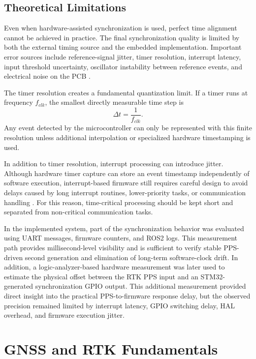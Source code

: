\subsection{Theoretical Limitations}

Even when hardware-assisted synchronization is used, perfect time alignment cannot be achieved in practice. The final synchronization quality is limited by both the external timing source and the embedded implementation. Important error sources include reference-signal jitter, timer resolution, interrupt latency, input threshold uncertainty, oscillator instability between reference events, and electrical noise on the PCB \cite{kopetz2011realtime,allan1966statistics,levine2012atomic}.

The timer resolution creates a fundamental quantization limit. If a timer runs at frequency $f_{clk}$, the smallest directly measurable time step is
\begin{equation}
\Delta t = \frac{1}{f_{clk}} .
\end{equation}
Any event detected by the microcontroller can only be represented with this finite resolution unless additional interpolation or specialized hardware timestamping is used.

In addition to timer resolution, interrupt processing can introduce jitter. Although hardware timer capture can store an event timestamp independently of software execution, interrupt-based firmware still requires careful design to avoid delays caused by long interrupt routines, lower-priority tasks, or communication handling \cite{kopetz2011realtime}. For this reason, time-critical processing should be kept short and separated from non-critical communication tasks.

In the implemented system, part of the synchronization behavior was evaluated using UART messages, firmware counters, and ROS2 logs. This measurement path provides millisecond-level visibility and is sufficient to verify stable PPS-driven second generation and elimination of long-term software-clock drift. In addition, a logic-analyzer-based hardware measurement was later used to estimate the physical offset between the RTK PPS input and an STM32-generated synchronization GPIO output. This additional measurement provided direct insight into the practical PPS-to-firmware response delay, but the observed precision remained limited by interrupt latency, GPIO switching delay, HAL overhead, and firmware execution jitter.

\section{GNSS and RTK Fundamentals}

